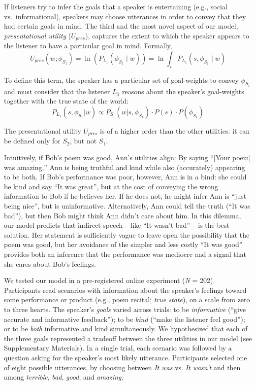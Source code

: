 \documentclass[12pt]{article}
\begin{document}
If listeners try to infer the goals that a speaker is entertaining
(e.g., social vs.~informational), speakers may choose utterances in
order to convey that they had certain goals in mind. The third and the most novel aspect of our model, 
\emph{presentational utility}
(\(U_{pres}\)), captures the extent to which the speaker appears to the
listener to have a particular goal in mind. Formally,
\[U_{pres}(w; \phi_{S_{1}}) = \ln(P_{L_1}(\phi_{S_1} \mid w)) = \ln \int_s P_{L_1}(s, \phi_{S_1} \mid w)\]

\noindent To define this term, the speaker has a particular set of goal-weights to convey $\phi_{S_{1}}$ and must consider that the listener \(L_1\) reasons about the speaker's goal-weights together with the true state of the world:
\[P_{L_1}(s, \phi_{S_{1}}| w) \propto P_{S_1}(w | s, \phi_{S_{1}}) \cdot P(s) \cdot P(\phi_{S_{1}})\]

\noindent The presentational utility $U_{pres}$ is of a higher order than the other utilities: it can be defined only for \(S_2\), but not \(S_1\).

Intuitively, if Bob's poem was good, Ann's utilities align:
By saying \enquote{{[}Your poem{]} was amazing,}
Ann is being truthful and kind while also (accurately) appearing to be both.
If Bob's performance was poor, however, Ann is in a bind: she could be kind and say \enquote{It was great}, but at the cost of conveying the wrong information to Bob if he believes her. If he does not, he might infer Ann is \enquote{just being nice}, but is uninformative.
Alternatively, Ann could tell the truth (\enquote{It was bad}), but then
Bob might think Ann didn't care about him. In this dilemma, our model predicts that indirect speech -- like \enquote{It wasn't bad} -- is the best solution. Her statement is sufficiently vague to leave open the possibility that the poem was good, but her avoidance of the simpler and less costly \enquote{It was good} provides both an inference that the performance was mediocre and a signal that she cares about Bob's feelings.


We tested our model in a pre-registered online experiment (\emph{N} = 202).
Participants read scenarios with information about the speaker's
feelings toward some performance or product (e.g., poem recital;
\emph{true state}), on a scale from zero to three hearts. The speaker's \emph{goals} varied across trials: to be \emph{informative}
(\enquote{give accurate and informative feedback}); to be \emph{kind}
(\enquote{make the listener feel good}); or to be \emph{both}
informative and kind simultaneously. We hypothesized that each of the
three goals represented a tradeoff between the three utilities in our
model (see Supplementary Materials). In a single trial, each scenario
was followed by a question asking for the speaker's most likely utterance.
Participants selected one of eight possible utterances, by choosing
between \emph{It was} vs. \emph{It wasn't} and then among
\emph{terrible}, \emph{bad}, \emph{good}, and \emph{amazing.}
\end{document}
